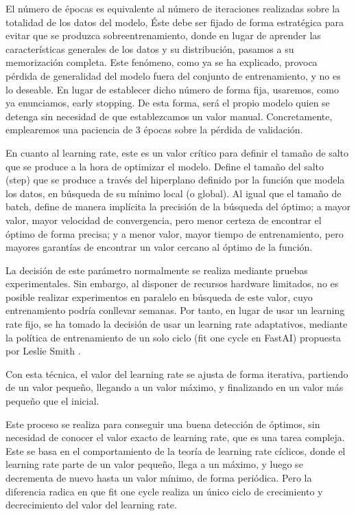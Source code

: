 El número de épocas es equivalente al número de iteraciones realizadas sobre la totalidad de los datos del modelo, Éste debe ser fijado de forma estratégica para evitar que se produzca sobreentrenamiento, donde en lugar de aprender las características generales de los datos y su distribución, pasamos a su memorización completa. Este fenómeno, como ya se ha explicado, provoca pérdida de generalidad del modelo fuera del conjunto de entrenamiento, y no es lo deseable. En lugar de establecer dicho número de forma fija, usaremos, como ya enunciamos, early stopping. De esta forma, será el propio modelo quien se detenga sin necesidad de que establezcamos un valor manual. Concretamente, emplearemos una paciencia de 3 épocas sobre la pérdida de validación.

En cuanto al learning rate, este es un valor crítico para definir el tamaño de salto que se produce a la hora de optimizar el modelo. Define el tamaño del salto (step) que se produce a través del hiperplano definido por la función que modela los datos, en búsqueda de su mínimo local (o global). Al igual que el tamaño de batch, define de manera implícita la precisión de la búsqueda del óptimo; a mayor valor, mayor velocidad de convergencia, pero menor certeza de encontrar el óptimo de forma precisa; y a menor valor, mayor tiempo de entrenamiento, pero mayores garantías de encontrar un valor cercano al óptimo de la función.

La decisión de este parámetro normalmente se realiza mediante pruebas experimentales. Sin embargo, al disponer de recursos hardware limitados, no es posible realizar experimentos en paralelo en búsqueda de este valor, cuyo entrenamiento podría conllevar semanas. Por tanto, en lugar de usar un learning rate fijo, se ha tomado la decisión de usar un learning rate adaptativos, mediante la política de entrenamiento de un solo ciclo (fit one cycle en FastAI) propuesta por Leslie Smith \cite{smith2018disciplined}.

Con esta técnica, el valor del learning rate se ajusta de forma iterativa, partiendo de un valor pequeño, llegando a un valor máximo, y finalizando en un valor más pequeño que el inicial.

Este proceso se realiza para conseguir una buena detección de óptimos, sin necesidad de conocer el valor exacto de learning rate, que es una tarea compleja. Este se basa en el comportamiento de la teoría de learning rate cíclicos, donde el learning rate parte de un valor pequeño, llega a un máximo, y luego se decrementa de nuevo hasta un valor mínimo, de forma periódica. Pero la diferencia radica en que fit one cycle realiza un único ciclo de crecimiento y decrecimiento del valor del learning rate.

